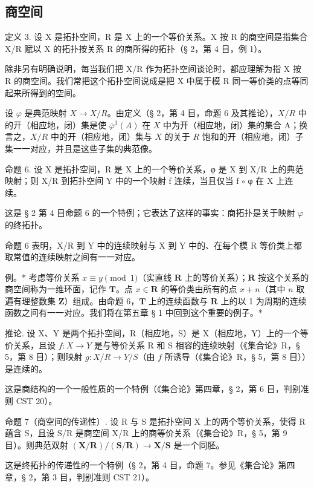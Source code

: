 \subsection{商空间}

定义 3. 设 X 是拓扑空间，R 是 X 上的一个等价关系。X 按 R 的商空间是指集合 X/R 赋以 X 的拓扑按关系 R 的商所得的拓扑（§ 2，第 4 目，例 1）。

除非另有明确说明，每当我们把 X/R 作为拓扑空间谈论时，都应理解为指 X 按 R 的商空间。我们常把这个拓扑空间说成是把 X 中属于模 R 同一等价类的点等同起来所得到的空间。

设 \(\varphi\) 是典范映射 \(X \to X/R\)。由定义（§ 2，第 4 目，命题 6 及其推论），\(X/R\) 中的开（相应地，闭）集是使 \(\bar{\varphi}^{1}(A)\) 在 \(X\) 中为开（相应地，闭）集的集合 A；换言之，\(X/R\) 中的开（相应地，闭）集与 \(X\) 的关于 \(R\) 饱和的开（相应地，闭）子集一一对应，并且是这些子集的典范像。

命题 6. 设 X 是拓扑空间，R 是 X 上的一个等价关系，φ 是 X 到 X/R 上的典范映射；则 X/R 到拓扑空间 Y 中的一个映射 f 连续，当且仅当 f \(\circ\) φ 在 X 上连续。

这是 § 2 第 4 目命题 6 的一个特例；它表达了这样的事实：商拓扑是关于映射 \(\varphi\) 的终拓扑。

命题 6 表明，X/R 到 Y 中的连续映射与 X 到 Y 中的、在每个模 R 等价类上都取常值的连续映射之间有一一对应。

例。* 考虑等价关系 \(x \equiv y \pmod{1}\)（实直线 \(\mathbf{R}\) 上的等价关系）；\(\mathbf{R}\) 按这个关系的商空间称为一维环面，记作 \(\mathbf{T}\)。点 \(x \in \mathbf{R}\) 的等价类由所有的点 \(x + n\)（其中 \(n\) 取遍有理整数集 \(\mathbf{Z}\)）组成。由命题 6，\(\mathbf{T}\) 上的连续函数与 \(\mathbf{R}\) 上的以 1 为周期的连续函数之间有一一对应。我们将在第五章 § 1 中回到这个重要的例子。*

推论. 设 X、Y 是两个拓扑空间，R（相应地，S）是 X（相应地，Y）上的一个等价关系，且设 \(f: X \to Y\) 是与等价关系 R 和 S 相容的连续映射（《集合论》R，§ 5，第 8 目）；则映射 \(g: X/R \to Y/S\)（由 \(f\) 所诱导（《集合论》R，§ 5，第 8 目））是连续的。

这是商结构的一个一般性质的一个特例（《集合论》第四章，§ 2，第 6 目，判别准则 CST 20）。

命题 7（商空间的传递性）. 设 R 与 S 是拓扑空间 X 上的两个等价关系，使得 R 蕴含 S，且设 S/R 是商空间 X/R 上的商等价关系（《集合论》R，§ 5，第 9 目）。则典范双射 \((\mathbf{X}/\mathbf{R})/(\mathbf{S}/\mathbf{R}) \to \mathbf{X}/\mathbf{S}\) 是一个同胚。

这是终拓扑的传递性的一个特例（§ 2，第 4 目，命题 7。参见《集合论》第四章，§ 2，第 3 目，判别准则 CST 21）。


